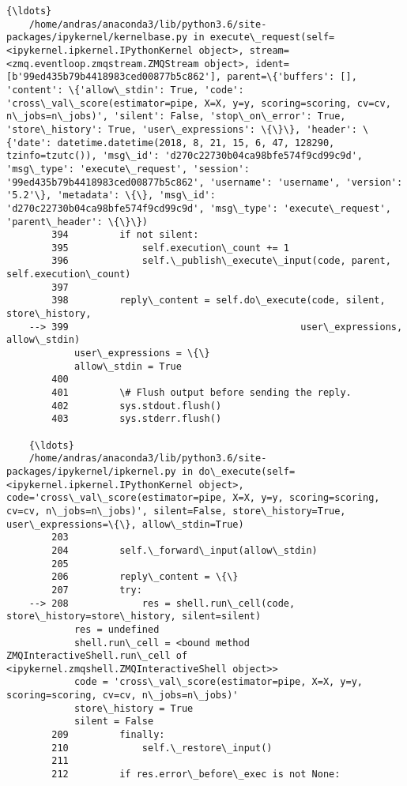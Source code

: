 \documentclass[11pt]{article}
\begin{document}
\begin{Verbatim}[commandchars=\\\{\}]
    {\ldots}
    /home/andras/anaconda3/lib/python3.6/site-packages/ipykernel/kernelbase.py in execute\_request(self=<ipykernel.ipkernel.IPythonKernel object>, stream=<zmq.eventloop.zmqstream.ZMQStream object>, ident=[b'99ed435b79b4418983ced00877b5c862'], parent=\{'buffers': [], 'content': \{'allow\_stdin': True, 'code': 'cross\_val\_score(estimator=pipe, X=X, y=y, scoring=scoring, cv=cv, n\_jobs=n\_jobs)', 'silent': False, 'stop\_on\_error': True, 'store\_history': True, 'user\_expressions': \{\}\}, 'header': \{'date': datetime.datetime(2018, 8, 21, 15, 6, 47, 128290, tzinfo=tzutc()), 'msg\_id': 'd270c22730b04ca98bfe574f9cd99c9d', 'msg\_type': 'execute\_request', 'session': '99ed435b79b4418983ced00877b5c862', 'username': 'username', 'version': '5.2'\}, 'metadata': \{\}, 'msg\_id': 'd270c22730b04ca98bfe574f9cd99c9d', 'msg\_type': 'execute\_request', 'parent\_header': \{\}\})
        394         if not silent:
        395             self.execution\_count += 1
        396             self.\_publish\_execute\_input(code, parent, self.execution\_count)
        397 
        398         reply\_content = self.do\_execute(code, silent, store\_history,
    --> 399                                         user\_expressions, allow\_stdin)
            user\_expressions = \{\}
            allow\_stdin = True
        400 
        401         \# Flush output before sending the reply.
        402         sys.stdout.flush()
        403         sys.stderr.flush()
    
    {\ldots}
    /home/andras/anaconda3/lib/python3.6/site-packages/ipykernel/ipkernel.py in do\_execute(self=<ipykernel.ipkernel.IPythonKernel object>, code='cross\_val\_score(estimator=pipe, X=X, y=y, scoring=scoring, cv=cv, n\_jobs=n\_jobs)', silent=False, store\_history=True, user\_expressions=\{\}, allow\_stdin=True)
        203 
        204         self.\_forward\_input(allow\_stdin)
        205 
        206         reply\_content = \{\}
        207         try:
    --> 208             res = shell.run\_cell(code, store\_history=store\_history, silent=silent)
            res = undefined
            shell.run\_cell = <bound method ZMQInteractiveShell.run\_cell of <ipykernel.zmqshell.ZMQInteractiveShell object>>
            code = 'cross\_val\_score(estimator=pipe, X=X, y=y, scoring=scoring, cv=cv, n\_jobs=n\_jobs)'
            store\_history = True
            silent = False
        209         finally:
        210             self.\_restore\_input()
        211 
        212         if res.error\_before\_exec is not None:
    

\end{Verbatim}
\end{document}
